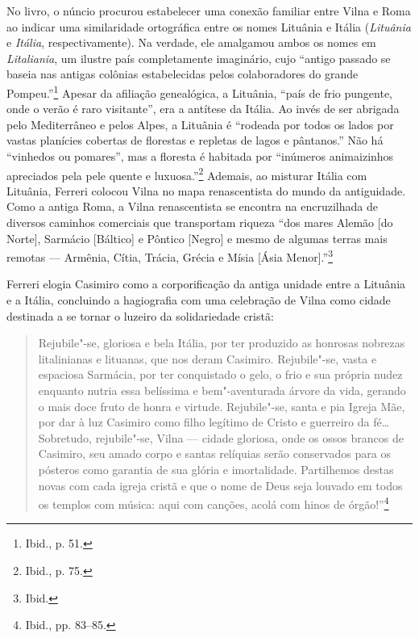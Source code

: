 No livro, o núncio procurou estabelecer uma conexão familiar entre Vilna
e Roma ao indicar uma similaridade ortográfica entre os nomes Lituânia e
Itália (\textit{Lituânia} e \textit{Itália}, respectivamente). Na verdade,
ele amalgamou ambos os nomes em \textit{Litaliania}, um ilustre país
completamente imaginário, cujo ``antigo passado se baseia nas antigas
colônias estabelecidas pelos colaboradores do grande Pompeu.''\footnote{Ibid.,
  p. 51.} Apesar da afiliação genealógica, a Lituânia, ``país de frio
pungente, onde o verão é raro visitante'', era a antítese da Itália. Ao
invés de ser abrigada pelo Mediterrâneo e pelos Alpes, a Lituânia é
``rodeada por todos os lados por vastas planícies cobertas de florestas
e repletas de lagos e pântanos.'' Não há ``vinhedos ou pomares'', mas a
floresta é habitada por ``inúmeros animaizinhos apreciados pela pele
quente e luxuosa.''\footnote{Ibid., p. 75.} Ademais, ao misturar Itália
com Lituânia, Ferreri colocou Vilna no mapa renascentista do mundo da
antiguidade. Como a antiga Roma, a Vilna renascentista se encontra na
encruzilhada de diversos caminhos comerciais que transportam riqueza
``dos mares Alemão {[}do Norte{]}, Sarmácio {[}Báltico{]} e Pôntico
{[}Negro{]} e mesmo de algumas terras mais remotas --- Armênia, Cítia,
Trácia, Grécia e Mísia {[}Ásia Menor{]}.''\footnote{Ibid.}

Ferreri elogia Casimiro como a corporificação da antiga unidade entre a
Lituânia e a Itália, concluindo a hagiografia com uma celebração de
Vilna como cidade destinada a se tornar o luzeiro da solidariedade
cristã:

\begin{quote}
Rejubile"-se, gloriosa e bela Itália, por ter produzido as honrosas
nobrezas litalinianas e lituanas, que nos deram Casimiro. Rejubile"-se,
vasta e espaciosa Sarmácia, por ter conquistado o gelo, o frio e sua
própria nudez enquanto nutria essa belíssima e bem"-aventurada árvore da
vida, gerando o mais doce fruto de honra e virtude. Rejubile"-se, santa e
pia Igreja Mãe, por dar à luz Casimiro como filho legítimo de Cristo e
guerreiro da fé\ldots{} Sobretudo, rejubile"-se, Vilna --- cidade gloriosa,
onde os ossos brancos de Casimiro, seu amado corpo e santas relíquias
serão conservados para os pósteros como garantia de sua glória e
imortalidade. Partilhemos destas novas com cada igreja cristã e que o
nome de Deus seja louvado em todos os templos com música: aqui com
canções, acolá com hinos de órgão!''\footnote{Ibid., pp. 83--85.}
\end{quote}


